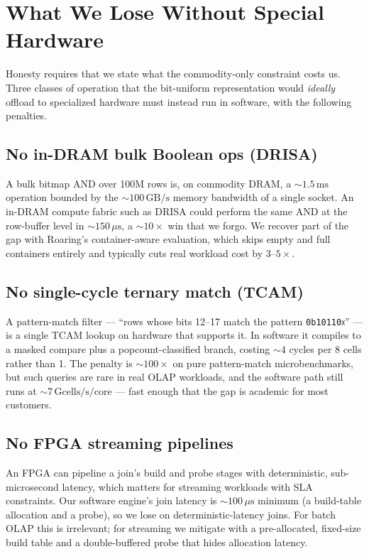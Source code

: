 \documentclass[10pt]{article}
\theoremstyle{definition}
\begin{document}
\section{What We Lose Without Special Hardware}

Honesty requires that we state what the commodity-only constraint costs us. Three classes of operation that the bit-uniform representation would \emph{ideally} offload to specialized hardware must instead run in software, with the following penalties.

\subsection{No in-DRAM bulk Boolean ops (DRISA)}

A bulk bitmap AND over 100M rows is, on commodity DRAM, a $\sim\!1.5\,\text{ms}$ operation bounded by the $\sim\!100\,\text{GB/s}$ memory bandwidth of a single socket. An in-DRAM compute fabric such as DRISA could perform the same AND at the row-buffer level in $\sim\!150\,\mu\text{s}$, a $\sim\!10\times$ win that we forgo. We recover part of the gap with Roaring's container-aware evaluation, which skips empty and full containers entirely and typically cuts real workload cost by $3$--$5\times$.

\subsection{No single-cycle ternary match (TCAM)}

A pattern-match filter --- ``rows whose bits 12--17 match the pattern \texttt{0b10110\textsc{x}}'' --- is a single TCAM lookup on hardware that supports it. In software it compiles to a masked compare plus a popcount-classified branch, costing $\sim\!4$ cycles per 8 cells rather than 1. The penalty is $\sim\!100\times$ on pure pattern-match microbenchmarks, but such queries are rare in real OLAP workloads, and the software path still runs at $\sim\!7\,\text{Gcells/s/core}$ --- fast enough that the gap is academic for most customers.

\subsection{No FPGA streaming pipelines}

An FPGA can pipeline a join's build and probe stages with deterministic, sub-microsecond latency, which matters for streaming workloads with SLA constraints. Our software engine's join latency is $\sim\!100\,\mu\text{s}$ minimum (a build-table allocation and a probe), so we lose on deterministic-latency joins. For batch OLAP this is irrelevant; for streaming we mitigate with a pre-allocated, fixed-size build table and a double-buffered probe that hides allocation latency.
\end{document}
